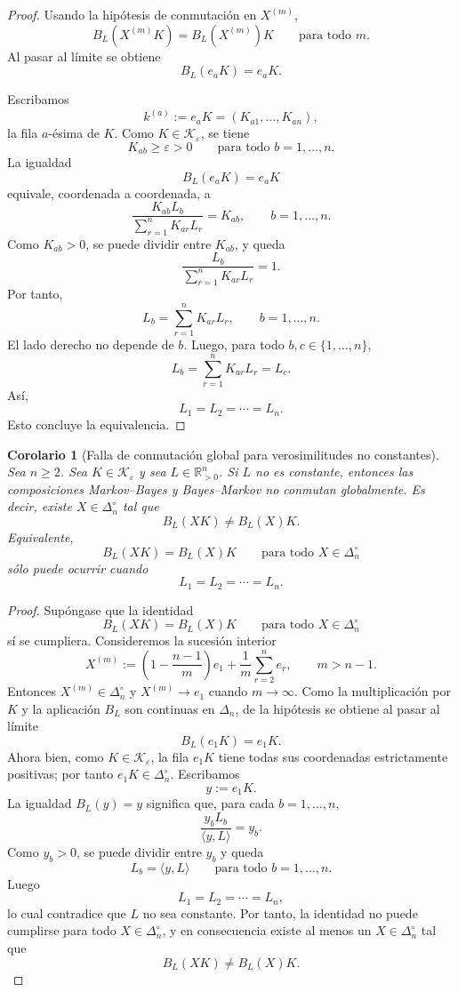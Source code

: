 \documentclass[12pt]{article}
\newtheorem{corolario}{Corolario}[section]
\begin{document}
\begin{proof}
Usando la hipótesis de conmutación en \(X^{(m)}\),
\[
B_L(X^{(m)}K)=B_L(X^{(m)})K
\qquad
\text{para todo }m.
\]
Al pasar al límite se obtiene
\[
B_L(e_aK)=e_aK.
\]

Escribamos
\[
k^{(a)}:=e_aK=(K_{a1},\dots,K_{an}),
\]
la fila \(a\)-ésima de \(K\). Como \(K\in\mathcal K_\varepsilon\), se tiene
\[
K_{ab}\ge \varepsilon>0
\qquad
\text{para todo }b=1,\dots,n.
\]
La igualdad
\[
B_L(e_aK)=e_aK
\]
equivale, coordenada a coordenada, a
\[
\frac{K_{ab}L_b}{\sum_{r=1}^nK_{ar}L_r}
=
K_{ab},
\qquad b=1,\dots,n.
\]
Como \(K_{ab}>0\), se puede dividir entre \(K_{ab}\), y queda
\[
\frac{L_b}{\sum_{r=1}^nK_{ar}L_r}
=
1.
\]
Por tanto,
\[
L_b
=
\sum_{r=1}^nK_{ar}L_r,
\qquad b=1,\dots,n.
\]
El lado derecho no depende de \(b\). Luego, para todo \(b,c\in\{1,\dots,n\}\),
\[
L_b
=
\sum_{r=1}^nK_{ar}L_r
=
L_c.
\]
Así,
\[
L_1=L_2=\cdots=L_n.
\]
Esto concluye la equivalencia.
\end{proof}


\begin{corolario}[Falla de conmutación global para verosimilitudes no constantes]
\label{cor:falla_conmutacion_global_L_no_constante}
Sea \(n\ge 2\). Sea \(K\in\mathcal K_\varepsilon\) y sea \(L\in\mathbb R_{>0}^n\). Si \(L\) no es constante, entonces las composiciones Markov--Bayes y Bayes--Markov no conmutan globalmente. Es decir, existe \(X\in\Delta_n^\circ\) tal que
\[
B_L(XK)\neq B_L(X)K.
\]
Equivalente,
\[
B_L(XK)=B_L(X)K
\qquad
\text{para todo }X\in\Delta_n^\circ
\]
sólo puede ocurrir cuando
\[
L_1=L_2=\cdots=L_n.
\]
\end{corolario}

\begin{proof}
Supóngase que la identidad
\[
B_L(XK)=B_L(X)K
\qquad
\text{para todo }X\in\Delta_n^\circ
\]
sí se cumpliera. Consideremos la sucesión interior
\[
X^{(m)}
:=
\left(1-\frac{n-1}{m}\right)e_1
+
\frac1m\sum_{r=2}^n e_r,
\qquad m>n-1.
\]
Entonces \(X^{(m)}\in\Delta_n^\circ\) y \(X^{(m)}\to e_1\) cuando \(m\to\infty\). Como la multiplicación por \(K\) y la aplicación \(B_L\) son continuas en \(\Delta_n\), de la hipótesis se obtiene al pasar al límite
\[
B_L(e_1K)=e_1K.
\]
Ahora bien, como \(K\in\mathcal K_\varepsilon\), la fila \(e_1K\) tiene todas sus coordenadas estrictamente positivas; por tanto \(e_1K\in\Delta_n^\circ\). Escribamos
\[
y:=e_1K.
\]
La igualdad \(B_L(y)=y\) significa que, para cada \(b=1,\dots,n\),
\[
\frac{y_bL_b}{\langle y,L\rangle}
=
y_b.
\]
Como \(y_b>0\), se puede dividir entre \(y_b\) y queda
\[
L_b=\langle y,L\rangle
\qquad
\text{para todo }b=1,\dots,n.
\]
Luego
\[
L_1=L_2=\cdots=L_n,
\]
lo cual contradice que \(L\) no sea constante. Por tanto, la identidad no puede cumplirse para todo \(X\in\Delta_n^\circ\), y en consecuencia existe al menos un \(X\in\Delta_n^\circ\) tal que
\[
B_L(XK)\neq B_L(X)K.
\]
\end{proof}
\end{document}
